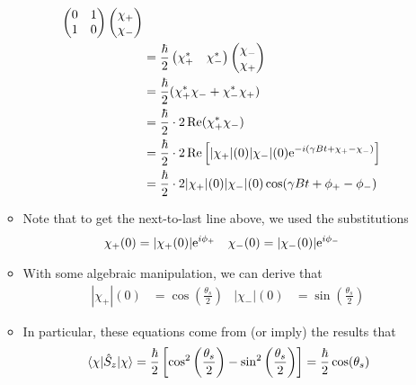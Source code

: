 \documentclass[../notes.tex]{subfiles}
\begin{document}
\begin{itemize}
\begin{itemize}
\begin{align*}
\begin{pmatrix}
                0 & 1\\
                1 & 0\\
            \end{pmatrix}
            \begin{pmatrix}
                \chi_+\\
                \chi_-\\
            \end{pmatrix}\\
            &= \frac{\hbar}{2}
            \begin{pmatrix}
                \chi_+^* & \chi_-^*\\
            \end{pmatrix}
            \begin{pmatrix}
                \chi_-\\
                \chi_+\\
            \end{pmatrix}\\
            &= \frac{\hbar}{2}(\chi_+^*\chi_-+\chi_-^*\chi_+)\\
            &= \frac{\hbar}{2}\cdot 2\re(\chi_+^*\chi_-)\\
            &= \frac{\hbar}{2}\cdot 2\re\left[ |\chi_+|(0)|\chi_-|(0)\e[-i(\gamma Bt+\chi_+-\chi_-)] \right]\\
            &= \frac{\hbar}{2}\cdot 2|\chi_+|(0)|\chi_-|(0)\cos(\gamma Bt+\phi_+-\phi_-)
        \end{align*}
        \item Note that to get the next-to-last line above, we used the substitutions
        \begin{align*}
            \chi_+(0) &= |\chi_+(0)|\e[i\phi_+]&
            \chi_-(0) &= |\chi_-(0)|\e[i\phi_-]
        \end{align*}
        \item With some algebraic manipulation, we can derive that
        \begin{align*}
            |\chi_+|(0) &= \cos(\frac{\theta_s}{2})&
            |\chi_-|(0) &= \sin(\frac{\theta_s}{2})
        \end{align*}
        \item In particular, these equations come from (or imply) the results that
        \begin{align*}
            \ev{\hat{S}_z}{\chi} &= \frac{\hbar}{2}\left[ \cos^2\left( \frac{\theta_s}{2} \right)-\sin^2\left( \frac{\theta_s}{2} \right) \right]
                = \frac{\hbar}{2}\cos(\theta_s)\\

\end{align*}
\end{itemize}
\end{itemize}
\end{document}
